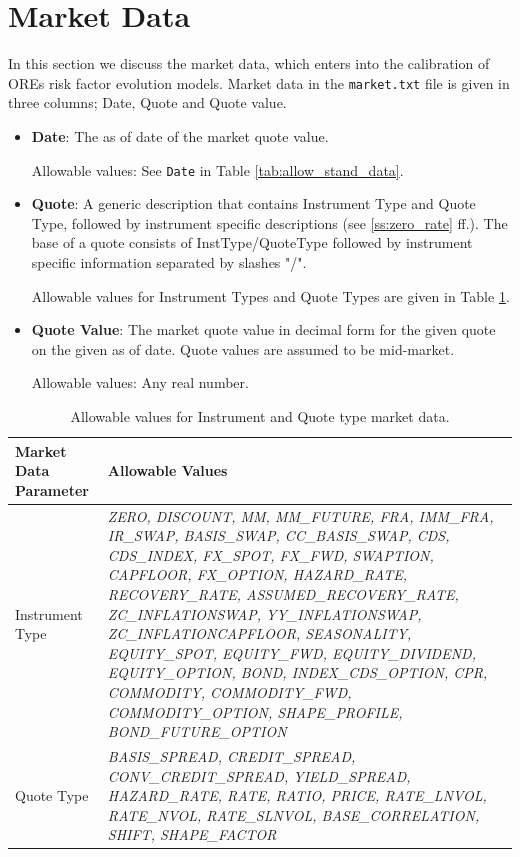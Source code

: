 \section{Market Data}\label{sec:market_data}
In this section we discuss the market data, which enters into the calibration of OREs risk factor evolution models.
Market data in the {\tt market.txt} file is given in three columns; Date, Quote and Quote value.

\begin{itemize}
\item {\bf Date}: The as of date of the market quote value.

Allowable values:  See \lstinline!Date! in Table \ref{tab:allow_stand_data}.

\item {\bf Quote}: A generic description that contains Instrument Type
  and Quote Type, followed by instrument specific descriptions (see
  \ref{ss:zero_rate} ff.). The base of a quote consists of
  InstType/QuoteType followed by instrument specific information
  separated by slashes "/".

  Allowable values for Instrument Types and Quote Types are given in Table \ref{tab:allow_market_data}.

\item {\bf Quote Value}: The market quote value in decimal form for
  the given quote on the given as of date. Quote values are assumed to
  be mid-market.

Allowable values: Any real number.
\end{itemize}

\begin{table}[H]
\centering
  \begin{tabular} {|l|p{5cm}|}
    \hline
    \bfseries{Market Data Parameter} & \bfseries{Allowable Values} \\
    \hline
 Instrument Type & \emph{ZERO, DISCOUNT, MM, MM\_FUTURE, FRA, IMM\_FRA,
  IR\_SWAP,  BASIS\_SWAP, CC\_BASIS\_SWAP, CDS, CDS\_INDEX, FX\_SPOT, FX\_FWD,
  SWAPTION, CAPFLOOR, FX\_OPTION, HAZARD\_RATE, RECOVERY\_RATE, ASSUMED\_RECOVERY\_RATE,
  ZC\_INFLATIONSWAP, YY\_INFLATIONSWAP, ZC\_INFLATIONCAPFLOOR,
  SEASONALITY, EQUITY\_SPOT, EQUITY\_FWD, EQUITY\_DIVIDEND,
    EQUITY\_OPTION, BOND, INDEX\_CDS\_OPTION, CPR, COMMODITY, COMMODITY\_FWD, COMMODITY\_OPTION,
    SHAPE\_PROFILE,
  BOND\_FUTURE\_OPTION} \\
\hline
  Quote Type & \emph{BASIS\_SPREAD, CREDIT\_SPREAD, CONV\_CREDIT\_SPREAD, YIELD\_SPREAD, HAZARD\_RATE,
  RATE, RATIO, PRICE, RATE\_LNVOL, RATE\_NVOL, RATE\_SLNVOL,
    BASE\_CORRELATION, SHIFT, SHAPE\_FACTOR} \\
\hline
  \end{tabular}
  \caption{Allowable values for Instrument and Quote type market data.}
  \label{tab:allow_market_data}
\end{table}

